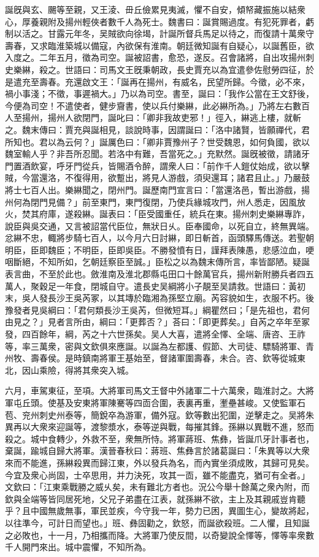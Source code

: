 \begin{pinyinscope}
誕旣與玄、颺等至親，又王淩、毌丘儉累見夷滅，懼不自安，傾帑藏振施以結衆心，厚養親附及揚州輕俠者數千人為死士。魏書曰：誕賞賜過度。有犯死罪者，虧制以活之。甘露元年冬，吴賊欲向徐堨，計誕所督兵馬足以待之，而復請十萬衆守壽春，又求臨淮築城以備寇，內欲保有淮南。朝廷微知誕有自疑心，以誕舊臣，欲入度之。二年五月，徵為司空。誕被詔書，愈恐，遂反。召會諸將，自出攻揚州刺史樂綝，殺之。世語曰：司馬文王旣秉朝政，長史賈充以為宜遣參佐慰勞四征，於是遣充至壽春。充還啟文王：「誕再在揚州，有威名，民望所歸。今徵，必不來，禍小事淺；不徵，事遲禍大。」乃以為司空。書至，誕曰：「我作公當在王文舒後，今便為司空！不遣使者，健步齎書，使以兵付樂綝，此必綝所為。」乃將左右數百人至揚州，揚州人欲閉門，誕叱曰：「卿非我故吏邪！」徑入，綝逃上樓，就斬之。魏末傳曰：賈充與誕相見，談說時事，因謂誕曰：「洛中諸賢，皆願禪代，君所知也。君以為云何？」誕厲色曰：「卿非賈豫州子？世受魏恩，如何負國，欲以魏室輸人乎？非吾所忍聞。若洛中有難，吾當死之。」充默然。誕旣被徵，請諸牙門置酒飲宴，呼牙門從兵，皆賜酒令醉，謂衆人曰：「前作千人鎧仗始成，欲以擊賊，今當還洛，不復得用，欲蹔出，將見人游戲，須臾還耳；諸君且止。」乃嚴鼓將士七百人出。樂綝聞之，閉州門。誕歷南門宣言曰：「當還洛邑，暫出游戲，揚州何為閉門見備？」前至東門，東門復閉，乃使兵緣城攻門，州人悉走，因風放火，焚其府庫，遂殺綝。誕表曰：「臣受國重任，統兵在東。揚州刺史樂綝專詐，說臣與吳交通，又言被詔當代臣位，無狀日乆。臣奉國命，以死自立，終無異端。忿綝不忠，輙將步騎七百人，以今月六日討綝，即日斬首，函頭驛馬傳送。若聖朝明臣，臣即魏臣；不明臣，臣即吳臣。不勝發憤有日，謹拜表陳愚，悲感泣血，哽咽斷絕，不知所如，乞朝廷察臣至誠。」臣松之以為魏末傳所言，率皆鄙陋。疑誕表言曲，不至於此也。斂淮南及淮北郡縣屯田口十餘萬官兵，揚州新附勝兵者四五萬人，聚穀足一年食，閉城自守。遣長史吴綱將小子靚至吴請救。世語曰：黃初末，吳人發長沙王吳芮冢，以其塼於臨湘為孫堅立廟。芮容貌如生，衣服不朽。後豫發者見吳綱曰：「君何類長沙王吳芮，但微短耳。」綱瞿然曰；「是先祖也，君何由見之？」見者言所由，綱曰：「更葬否？」荅曰：「即更葬矣。」自芮之卒年至冢發，四百餘年，綱，芮之十六世孫矣。吴人大喜，遣將全懌、全端、唐咨、王祚等，率三萬衆，密與文欽俱來應誕。以誕為左都護、假節、大司徒、驃騎將軍、青州牧、壽春侯。是時鎮南將軍王基始至，督諸軍圍壽春，未合。咨、欽等從城東北，因山乘險，得將其衆突入城。

六月，車駕東征，至項。大將軍司馬文王督中外諸軍二十六萬衆，臨淮討之。大將軍屯丘頭。使基及安東將軍陳騫等四靣合圍，表裏再重，壍壘甚峻。又使監軍石苞、兖州刺史州泰等，簡銳卒為游軍，備外寇。欽等數出犯圍，逆擊走之。吴將朱異再以大衆來迎誕等，渡黎漿水，泰等逆與戰，每摧其鋒。孫綝以異戰不進，怒而殺之。城中食轉少，外救不至，衆無所恃。將軍蔣班、焦彝，皆誕爪牙計事者也，棄誕，踰城自歸大將軍。漢晉春秋曰：蔣班、焦彝言於諸葛誕曰：「朱異等以大衆來而不能進，孫綝殺異而歸江東，外以發兵為名，而內實坐須成敗，其歸可見矣。今宜及衆心尚固，士卒思用，并力決死，攻其一靣，雖不能盡克，猶可有全者。」文欽曰：「江東乘戰勝之威乆矣，未有難北方者也。況公今舉十餘萬之衆內附，而欽與全端等皆同居死地，父兄子弟盡在江表，就孫綝不欲，主上及其親戚豈肯聽乎？且中國無歲無事，軍民並疾，今守我一年，勢力已困，異圖生心，變故將起，以往準今，可計日而望也。」班、彝固勸之，欽怒，而誕欲殺班。二人懼，且知誕之必敗也，十一月，乃相攜而降。大將軍乃使反間，以奇變說全懌等，懌等率衆數千人開門來出。城中震懼，不知所為。


\end{pinyinscope}
